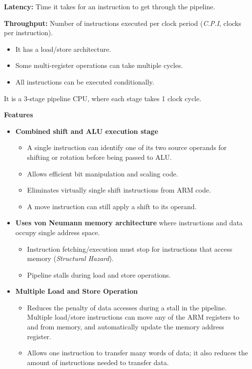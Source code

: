 \documentclass[a4paper,11pt]{article}
\begin{document}
\textbf{Latency:} Time it takes for an instruction to get through the pipeline.\par
\textbf{Throughput:} Number of instructions executed per clock period (\emph{C.P.I}, clocks per instruction).

\begin{itemize}
  \item It has a load/store architecture.
  \item Some multi-register operations can take multiple cycles.
  \item All instructions can be executed conditionally.
\end{itemize}
It is a 3-stage pipeline CPU, where each stage takes 1 clock cycle.

\textbf{Features}
\begin{itemize}
  \item \textbf{Combined shift and ALU execution stage}
        \begin{itemize}
          \item A single instruction can identify one of its two source operands for shifting or rotation before being passed to ALU.
          \item Allows efficient bit manipulation and scaling code.
          \item Eliminates virtually single shift instructions from ARM code.
          \item A move instruction can still apply a shift to its operand.
        \end{itemize}
  \item \textbf{Uses von Neumann memory architecture} where instructions and data occupy single address space.
        \begin{itemize}
          \item Instruction fetching/execution must stop for instructions that access memory (\emph{Structural Hazard}).
          \item Pipeline stalls during load and store operations.
        \end{itemize}
  \item \textbf{Multiple Load and Store Operation}
        \begin{itemize}
          \item Reduces the penalty of data accesses during a stall in the pipeline. Multiple load/store instructions can move any of the ARM registers to and from memory, and automatically update the memory address register.
          \item Allows one instruction to transfer many words of data; it also reduces the amount of instructions needed to transfer data.

\end{itemize}
\end{itemize}
\end{document}
